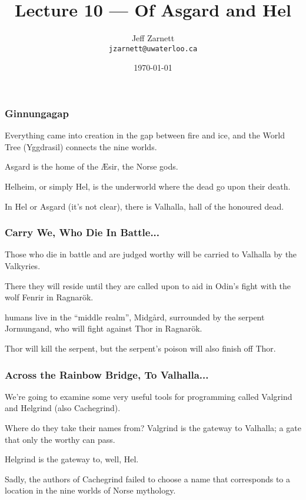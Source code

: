 

\title{Lecture 10 --- Of Asgard and Hel }

\author{Jeff Zarnett \\ \small \texttt{jzarnett@uwaterloo.ca}}
\date{\today}




\begin{frame}
  \titlepage

 \end{frame}

\begin{frame}
\frametitle{Ginnungagap}

Everything came into creation in the gap between fire and ice, and the World Tree (Yggdrasil) connects the nine worlds. 

Asgard is the home of the \AE sir, the Norse gods. 

Helheim, or simply Hel, is the underworld where the dead go upon their death. 

 In Hel or Asgard (it's not clear), there is Valhalla, hall of the honoured dead. 

\end{frame}

\begin{frame}
\frametitle{Carry We, Who Die In Battle...}

Those who die in battle and are judged worthy will be carried to Valhalla by the Valkyries. 

There they will reside until they are called upon to aid in Odin's fight with the wolf Fenrir in Ragnar\"ok.

humans live in the ``middle realm'', Midg\aa rd, surrounded by the serpent Jormungand, who will fight against Thor in  Ragnar\"ok. 

Thor will kill the serpent, but the serpent's poison will also finish off Thor.

\end{frame}

\begin{frame}
\frametitle{Across the Rainbow Bridge, To Valhalla...}

We're going to examine some very useful tools for programming called Valgrind and Helgrind (also Cachegrind).

Where do they take their names from? Valgrind is the gateway to Valhalla; a gate that only the worthy can pass. 

Helgrind is the gateway to, well, Hel. 

 Sadly, the authors of Cachegrind failed to choose a name that corresponds to a location in the nine worlds of Norse mythology. 

\end{frame}

